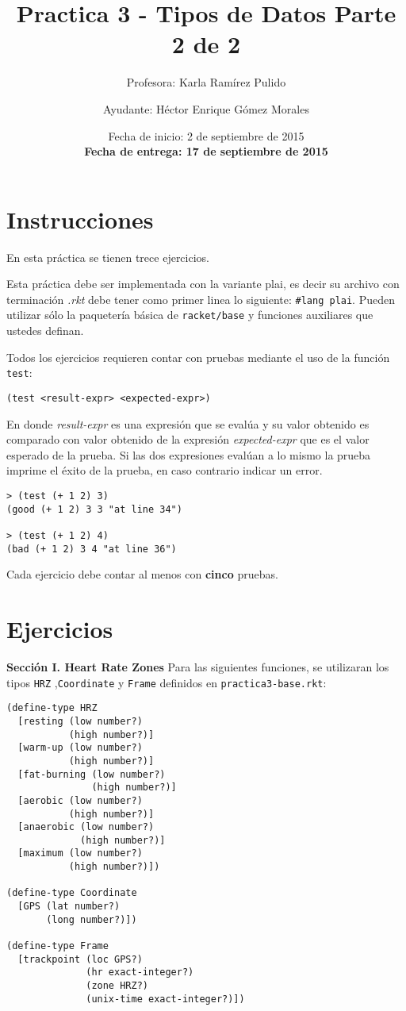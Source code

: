 \documentclass{article}
\author{Profesora: Karla Ramírez Pulido \and
  Ayudante: Héctor Enrique Gómez Morales}
\title{Practica 3 - Tipos de Datos Parte 2 de 2}
\date{Fecha de inicio: 2 de septiembre de 2015\\
  \textbf{Fecha de entrega: 17 de septiembre de 2015}}
\begin{document}
\maketitle
\section{Instrucciones}
En esta práctica se tienen trece ejercicios.

Esta práctica debe ser implementada con la variante plai, es decir
su archivo con terminación \textit{.rkt} debe tener como primer linea lo siguiente:
\texttt{\#lang plai}. Pueden utilizar sólo la paquetería básica de
\texttt{racket/base} y funciones auxiliares que ustedes definan.

Todos los ejercicios requieren contar con pruebas mediante el uso de
la función \texttt{test}:
\begin{verbatim}
(test <result-expr> <expected-expr>)
\end{verbatim}

En donde \textit{result-expr} es una expresión que se evalúa y su valor obtenido
es comparado con valor obtenido de la expresión \textit{expected-expr} que es el
valor esperado de la prueba. Si las dos expresiones evalúan a lo mismo la prueba
imprime el éxito de la prueba, en caso contrario indicar un error.

\begin{verbatim}
> (test (+ 1 2) 3)
(good (+ 1 2) 3 3 "at line 34")

> (test (+ 1 2) 4)
(bad (+ 1 2) 3 4 "at line 36")
\end{verbatim}

Cada ejercicio debe contar al menos con \textbf{cinco} pruebas.

\section{Ejercicios}
\textbf{Sección I. Heart Rate Zones} Para las siguientes funciones, se utilizaran los tipos \verb;HRZ; ,\verb;Coordinate; y \verb;Frame; definidos en \verb;practica3-base.rkt;:
\begin{verbatim}
(define-type HRZ
  [resting (low number?)
           (high number?)]
  [warm-up (low number?)
           (high number?)]
  [fat-burning (low number?)
               (high number?)]
  [aerobic (low number?)
           (high number?)]
  [anaerobic (low number?)
             (high number?)]
  [maximum (low number?)
           (high number?)])

(define-type Coordinate
  [GPS (lat number?)
       (long number?)])

(define-type Frame
  [trackpoint (loc GPS?)
              (hr exact-integer?)
              (zone HRZ?)
              (unix-time exact-integer?)])
\end{verbatim}
\end{document}
